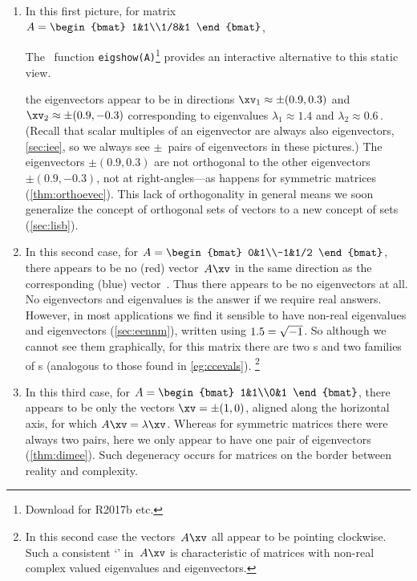 \begin{enumerate}
\item 
In this first picture, for matrix
\( A=\begin{bmat} 1&1\\1/8&1 \end{bmat}\),
%
\begin{aside}
The \script[1]\ function \texttt{eigshow(A)}\footnote{Download for R2017b etc.} provides an interactive alternative to this static view.
\end{aside}%
the eigenvectors appear to be in directions \(\xv_1\approx\pm(0.9,0.3)\) and \(\xv_2\approx\pm(0.9,-0.3)\) corresponding to eigenvalues \(\lambda_1\approx1.4\) and \(\lambda_2\approx 0.6\)\,.
(Recall that scalar multiples of an eigenvector are always also eigenvectors, \cref{sec:iee}, so we always see \(\pm\)~pairs of eigenvectors in these pictures.)
The eigenvectors \(\pm(0.9,0.3)\) are not orthogonal to the other 
eigenvectors \(\pm(0.9,-0.3)\), not at right-angles---as happens for symmetric matrices (\cref{thm:orthoevec}).
This lack of orthogonality in general means we soon generalize the concept of orthogonal sets of vectors to a new concept of  sets (\cref{sec:lisb}).

\item 
In this second case, for
\( A=\begin{bmat} 0&1\\-1&1/2 \end{bmat}\), %
there appears to be no (red) vector~\(A\xv\) in the same direction as the corresponding (blue) vector~\xv.
Thus there appears to be no eigenvectors at all.
No eigenvectors and eigenvalues is the answer if we require real answers.
However, in most applications we find it sensible to have non-real  eigenvalues and eigenvectors (\cref{sec:eennm}), written using \(1.5=\sqrt{-1}\).
So although we cannot see them graphically, for this matrix there are two s and two families of s (analogous to those found in \cref{eg:ccevals}).%
\footnote{In this second case the vectors~\(A\xv\) all appear to be pointing clockwise.  
Such a consistent `' in~\(A\xv\) is characteristic of matrices with non-real complex valued eigenvalues and eigenvectors.}

\item 
In this third case, for
\( A=\begin{bmat} 1&1\\0&1 \end{bmat}\),
%
there appears to be only the vectors \(\xv=\pm(1,0)\), aligned along the horizontal axis, for which \(A\xv=\lambda\xv\).
Whereas for symmetric matrices there were always two pairs, here we only appear to have one pair of eigenvectors (\cref{thm:dimee}).
Such degeneracy occurs for matrices on the border between reality and complexity.

\end{enumerate}


